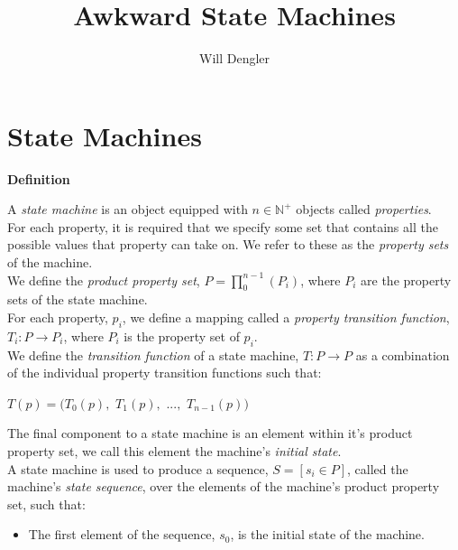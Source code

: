 \documentclass[a4paper,12pt]{article}
\begin{document}
\title{Awkward State Machines}
\author{Will Dengler}
\maketitle

\section{State Machines}
\label{section:state_machines}


\label{definition:state_machine}
\hypertarget{definition:state_machine}{}
\begin{tcolorbox}
\textbf{Definition}

\noindent A \textit{state machine} is an object equipped with $n \in \mathbb{N^+}$ objects called \textit{properties}.\\

\noindent For each property, it is required that we specify some set that contains all the possible values that property can take on. We refer to these as the \textit{property sets} of the machine.\\

\noindent We define the \textit{product property set}, $P = \prod^{n-1}_0{(P_i)}$, where $P_i$ are the property sets of the state machine.\\

\noindent For each property, $p_i$, we define a mapping called a \textit{property transition function}, $T_i: P \rightarrow P_i$, where $P_i$ is the property set of $p_i$.\\

\noindent We define the \textit{transition function} of a state machine, $T: P \rightarrow P$ as a combination of the individual property transition functions such that:
\begin{center}
$T(p) = (T_0(p),$ $T_1(p),$ $...,$ $T_{n-1}(p))$
\end{center}

\noindent The final component to a state machine is an element within it's product property set, we call this element the machine's \textit{initial state}.\\

\noindent A state machine is used to produce a sequence, $S = [s_i \in P]$, called the machine's \textit{state sequence}, over the elements of the machine's product property set, such that:
\begin{itemize}
\item The first element of the sequence, $s_0$, is the initial state of the machine.


\end{itemize}
\end{tcolorbox}
\end{document}
